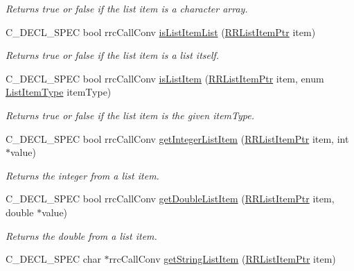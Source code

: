 \begin{DoxyCompactItemize}
\begin{DoxyCompactList}\small\item\em Returns true or false if the list item is a character array. \end{DoxyCompactList}\item 
C\-\_\-\-D\-E\-C\-L\-\_\-\-S\-P\-E\-C bool rrc\-Call\-Conv \hyperlink{group__list_gab4063382394faabc2d664ba2e11cb784}{is\-List\-Item\-List} (\hyperlink{rrc__types_8h_a79938364b69256c42480bb3a29ebf73e}{R\-R\-List\-Item\-Ptr} item)
\begin{DoxyCompactList}\small\item\em Returns true or false if the list item is a list itself. \end{DoxyCompactList}\item 
C\-\_\-\-D\-E\-C\-L\-\_\-\-S\-P\-E\-C bool rrc\-Call\-Conv \hyperlink{group__list_gaaefe3841ee62383e81de8b7cb12f3468}{is\-List\-Item} (\hyperlink{rrc__types_8h_a79938364b69256c42480bb3a29ebf73e}{R\-R\-List\-Item\-Ptr} item, enum \hyperlink{rrc__types_8h_ab99437ab2e88aa90b7ebb8add042b25e}{List\-Item\-Type} item\-Type)
\begin{DoxyCompactList}\small\item\em Returns true or false if the list item is the given item\-Type. \end{DoxyCompactList}\item 
C\-\_\-\-D\-E\-C\-L\-\_\-\-S\-P\-E\-C bool rrc\-Call\-Conv \hyperlink{group__list_gad99586f90455ec84208346fd023ad859}{get\-Integer\-List\-Item} (\hyperlink{rrc__types_8h_a79938364b69256c42480bb3a29ebf73e}{R\-R\-List\-Item\-Ptr} item, int $\ast$value)
\begin{DoxyCompactList}\small\item\em Returns the integer from a list item. \end{DoxyCompactList}\item 
C\-\_\-\-D\-E\-C\-L\-\_\-\-S\-P\-E\-C bool rrc\-Call\-Conv \hyperlink{group__list_gae8ee2b3a8aa50901408415a90da0439c}{get\-Double\-List\-Item} (\hyperlink{rrc__types_8h_a79938364b69256c42480bb3a29ebf73e}{R\-R\-List\-Item\-Ptr} item, double $\ast$value)
\begin{DoxyCompactList}\small\item\em Returns the double from a list item. \end{DoxyCompactList}\item 
C\-\_\-\-D\-E\-C\-L\-\_\-\-S\-P\-E\-C char $\ast$rrc\-Call\-Conv \hyperlink{group__list_ga177fc925d1726b0844c17837d3ed4425}{get\-String\-List\-Item} (\hyperlink{rrc__types_8h_a79938364b69256c42480bb3a29ebf73e}{R\-R\-List\-Item\-Ptr} item)

\end{DoxyCompactItemize}

